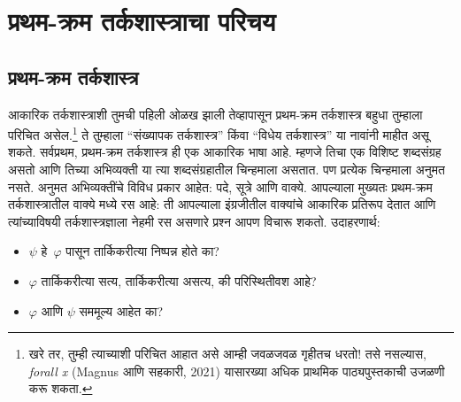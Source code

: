 \chapter{प्रथम-क्रम तर्कशास्त्राचा परिचय}\label{fol:int::chap}









\section{प्रथम-क्रम तर्कशास्त्र}\label{fol:int:fol:sec}

आकारिक तर्कशास्त्राशी तुमची पहिली ओळख झाली तेव्हापासून प्रथम-क्रम
तर्कशास्त्र बहुधा तुम्हाला परिचित असेल.\footnote{खरे तर, तुम्ही त्याच्याशी
परिचित आहात असे आम्ही जवळजवळ गृहीतच धरतो!{} तसे नसल्यास,
\emph{forall x} (Magnus आणि सहकारी, 2021) यासारख्या अधिक प्राथमिक
पाठ्यपुस्तकाची उजळणी करू शकता.} ते तुम्हाला ``संख्यापक तर्कशास्त्र''
किंवा ``विधेय तर्कशास्त्र'' या नावांनी माहीत असू शकते. सर्वप्रथम,
प्रथम-क्रम तर्कशास्त्र ही एक आकारिक भाषा आहे. म्हणजे तिचा एक विशिष्ट
शब्दसंग्रह असतो आणि तिच्या अभिव्यक्ती या त्या शब्दसंग्रहातील चिन्हमाला
असतात. पण प्रत्येक चिन्हमाला अनुमत नसते. अनुमत अभिव्यक्तींचे विविध
प्रकार आहेत: पदे, सूत्रे आणि वाक्ये. आपल्याला मुख्यतः
प्रथम-क्रम तर्कशास्त्रातील वाक्ये मध्ये रस आहे: ती आपल्याला
इंग्रजीतील वाक्यांचे आकारिक प्रतिरूप देतात आणि त्यांच्याविषयी
तर्कशास्त्रज्ञाला नेहमी रस असणारे प्रश्न आपण विचारू शकतो. उदाहरणार्थ:
\begin{itemize}
    \item $\psi$ हे~$\varphi$ पासून तार्किकरीत्या निष्पन्न होते का?
    \item $\varphi$ तार्किकरीत्या सत्य, तार्किकरीत्या असत्य, की
परिस्थितीवश आहे?
    \item $\varphi$ आणि $\psi$ सममूल्य आहेत का?
\end{itemize}

